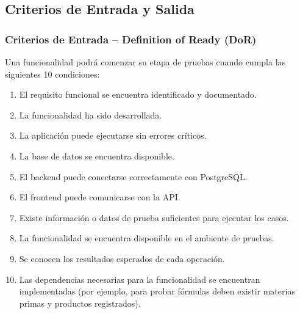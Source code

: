 \documentclass[11pt,a4paper]{article}
\begin{document}
\subsection{Criterios de Entrada y Salida}
\subsubsection{Criterios de Entrada -- Definition of Ready (DoR)}
Una funcionalidad podrá comenzar su etapa de pruebas cuando cumpla las siguientes 10 condiciones:
\begin{enumerate}
    \item El requisito funcional se encuentra identificado y documentado.
    \item La funcionalidad ha sido desarrollada.
    \item La aplicación puede ejecutarse sin errores críticos.
    \item La base de datos se encuentra disponible.
    \item El backend puede conectarse correctamente con PostgreSQL.
    \item El frontend puede comunicarse con la API.
    \item Existe información o datos de prueba suficientes para ejecutar los casos.
    \item La funcionalidad se encuentra disponible en el ambiente de pruebas.
    \item Se conocen los resultados esperados de cada operación.
    \item Las dependencias necesarias para la funcionalidad se encuentran implementadas (por ejemplo, para probar fórmulas deben existir materias primas y productos registrados).
\end{enumerate}
\end{document}

